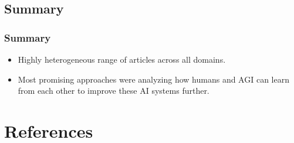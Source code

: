 \documentclass[
	11pt, %
]{beamer}
\begin{document}

\subsection{Summary}
\begin{frame}
	\frametitle{Summary}
		
	\begin{itemize}

     \item Highly heterogeneous range of articles across all domains.

     \bigskip %
     
     \item Most promising approaches were analyzing how humans and AGI can learn from each other to improve these AI systems further.

     


     
        

	\end{itemize}
 
\end{frame}

\iffalse
\section{References}
\end{document}

